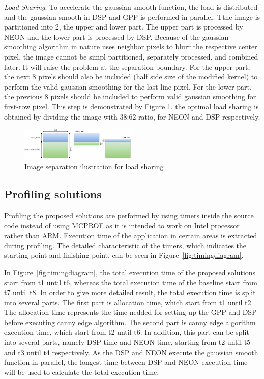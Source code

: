 \documentclass[conference]{IEEEtran}
\begin{document}
\textit{Load-Sharing}: To accelerate the gaussian-smooth function, the load is distributed and the gaussian smooth in DSP and GPP is performed in parallel. Tthe image is partitioned into 2, the upper and lower part. The upper part is processed by NEON and the lower part is processed by DSP. Because of the gaussian smoothing algorithm in nature uses neighbor pixels to blurr the respective center pixel, the image cannot be simpl partitioned, separately processed, and combined later. It will raise the problem at the separation boundary. For the upper part, the next 8 pixels should also be included (half side size of the modified kernel) to perform the valid gaussian smoothing for the last line pixel. For the lower part, the previous 8 pixels should be included to perform valid gaussian smoothing for first-row pixel. This step is demonstrated by Figure \ref{fig:divide et impera}. the optimal load sharing is obtained by dividing the image with 38:62 ratio, for NEON and DSP respectively.

\begin{figure}[!ht]
	    \centering
	    \includegraphics[width=0.5\textwidth]{pic/row_col.jpg}
   	\caption{Image separation ilustration for load sharing}
   	\label{fig:divide et impera}
   \end{figure}


\subsection{Profiling solutions}
Profiling the proposed solutions are performed by using timers inside the source code instead of using MCPROF as it is intended to work on Intel processor rather than ARM. Execution time of the application in certain areas is extracted during profiling. The detailed characteristic of the timers, which indicates the starting point and finishing point, can be seen in Figure~\ref{fig:timingdiagram}. 

In Figure~\ref{fig:timingdiagram}, the total execution time of the proposed solutions start from t1 until t6, whereas the total execution time of the baseline start from t7 until t8. In order to give more detailed result, the total execution time is split into several parts. The first part is allocation time, which start from t1 until t2. The allocation time represents the time nedded for setting up the GPP and DSP before executing canny edge algorithm. The second part is canny edge algorithm execution time, which start from t2 until t6. In addition, this part can be split into several parts, namely DSP time and NEON time, starting from t2 until t5 and t3 until t4 respectively. As the DSP and NEON execute the gaussian smooth function in parallel, the longest time between DSP and NEON execution time will be used to calculate the total execution time.
\end{document}

